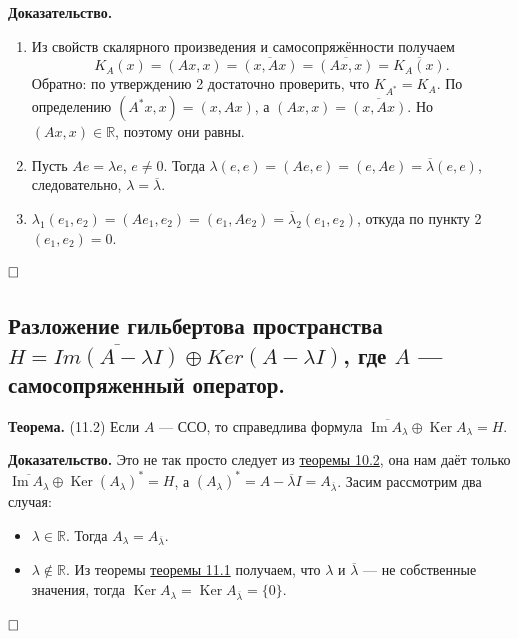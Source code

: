 \documentclass[12pt, a4paper]{article}
\DeclareMathOperator{\im}{Im}
\DeclareMathOperator{\Ker}{Ker}
\newcommand{\QED}{$\hfill\square$}
\begin{document}
\textbf{Доказательство.}
\begin{enumerate}
    \item Из свойств скалярного произведения и самосопряжённости получаем
        \[
            K_A(x) = (Ax, x) = \overline{(x, Ax)} = \overline{(Ax, x)} = \overline{K_A(x)}.
        \]
        Обратно: по утверждению 2 достаточно проверить, что $K_{A^*} = K_A$.
        По определению $(A^* x, x) = (x, Ax)$, а $(Ax, x) = \overline{(x, Ax)}$.
        Но $(Ax, x) \in \mathbb R$, поэтому они равны.

    \item Пусть $Ae = \lambda e$, $e \ne 0$. Тогда $\lambda (e, e) = (Ae, e) = (e, Ae) = \overline \lambda (e, e)$, следовательно, $\lambda = \overline \lambda$.

    \item $\lambda_1(e_1, e_2) = (Ae_1, e_2) = (e_1, Ae_2) = \overline \lambda_2 (e_1, e_2)$, откуда по пункту 2 $(e_1, e_2) = 0$.
\end{enumerate}

\QED



\subsection{Разложение гильбертова пространства \texorpdfstring{$H = \overline{Im(A - \lambda I)} \oplus Ker(A - \lambda I)$}{H = Im(A - lambda I) (+) Ker(A - lambda I)}, где \texorpdfstring{$A$}{A} --- самосопряженный оператор.}

 \label{th:11-2} \textbf{Теорема.} (11.2) Если $A$ --- ССО, то справедлива формула $\overline{\im A_\lambda} \oplus \Ker A_\lambda = H$.

\textbf{Доказательство.} Это не так просто следует из \hyperref[th:10-2]{теоремы 10.2}, она нам даёт только $\overline{\im A_\lambda} \oplus \Ker (A_\lambda)^* = H$, а $(A_\lambda)^* = A - \overline \lambda I = A_{\overline \lambda}$.
Засим рассмотрим два случая:
\begin{itemize}
    \item $\lambda \in \mathbb R$. Тогда $A_\lambda = A_{\overline \lambda}$.
    \item $\lambda \notin \mathbb R$.
        Из теоремы \hyperref[th:11-1]{теоремы 11.1} получаем, что $\lambda$ и $\overline \lambda$ --- не собственные значения, тогда $\Ker A_\lambda = \Ker A_{\overline \lambda} = \{0\}$.
\end{itemize}

\QED
\end{document}
